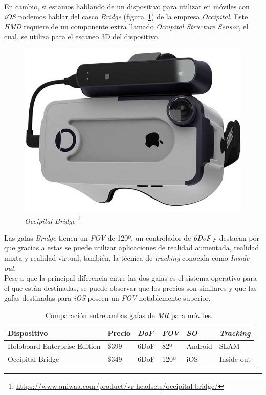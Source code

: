 En cambio, si estamos hablando de un dispositivo para utilizar en móviles con \textit{iOS} podemos hablar del casco \textit{Bridge} (figura~\ref{fig:mriosBRIDGE}) de la empresa \textit{Occipital}. Este \textit{HMD} requiere de un componente extra llamado \textit{Occipital Structure Sensor}, el cual, se utiliza para el escaneo 3D del dispositivo.

\begin{figure}[H]
    \centering
    \includegraphics[scale=0.3]{Images/Estado del arte/mrios.jpg}
    \caption{
    \textit{Occipital Bridge}
    \protect\footnote{\url{https://www.aniwaa.com/product/vr-headsets/occipital-bridge/}}
    }
    \label{fig:mriosBRIDGE}
\end{figure}

Las gafas \textit{Bridge} tienen un \textit{FOV} de 120º, un controlador de \textit{6DoF} y destacan por que gracias a estas se puede utilizar aplicaciones de realidad aumentada, realidad mixta y realidad virtual, también, la técnica de \textit{tracking} conocida como \textit{Inside-out}.\\

Pese a que la principal diferencia entre las dos gafas es el sistema operativo para el que están destinadas, se puede observar que los precios son similares y que las gafas destinadas para \textit{iOS} poseen un \textit{FOV} notablemente superior.


\begin{table}[H]
\centering
\renewcommand{\arraystretch}{1.5}
\begin{tabular}{llllll}
\hline
Dispositivo                  & Precio & \textit{DoF} & \textit{FOV} & \textit{SO} & \textit{Tracking} \\
\hline
Holoboard Enterprise Edition & \$399  & 6DoF         & 82º          & Android     & SLAM              \\
Occipital Bridge             & \$349  & 6DoF         & 120º         & iOS         & Inside-out\\\hline       
\end{tabular}
\caption{Comparación entre ambas gafas de \textit{MR} para móviles.}
\label{cuadro:comparacionphonesMR}
\end{table}

